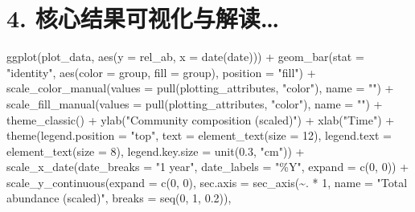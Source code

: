 \documentclass[
  letterpaper,
  DIV=11,
  numbers=noendperiod]{scrreprt}
\newenvironment{Shaded}{\begin{snugshade}}{\end{snugshade}}
\newcommand{\AttributeTok}[1]{\textcolor[rgb]{0.40,0.45,0.13}{#1}}
\newcommand{\DecValTok}[1]{\textcolor[rgb]{0.68,0.00,0.00}{#1}}
\newcommand{\FloatTok}[1]{\textcolor[rgb]{0.68,0.00,0.00}{#1}}
\newcommand{\FunctionTok}[1]{\textcolor[rgb]{0.28,0.35,0.67}{#1}}
\newcommand{\NormalTok}[1]{\textcolor[rgb]{0.00,0.23,0.31}{#1}}
\newcommand{\SpecialCharTok}[1]{\textcolor[rgb]{0.37,0.37,0.37}{#1}}
\newcommand{\StringTok}[1]{\textcolor[rgb]{0.13,0.47,0.30}{#1}}
\begin{document}
\section{4.
核心结果可视化与解读\ldots{}}\label{ux6838ux5fc3ux7ed3ux679cux53efux89c6ux5316ux4e0eux89e3ux8bfb}

\begin{Shaded}
\begin{Highlighting}[]
\FunctionTok{ggplot}\NormalTok{(plot\_data, }\FunctionTok{aes}\NormalTok{(}\AttributeTok{y =}\NormalTok{ rel\_ab, }\AttributeTok{x =} \FunctionTok{date}\NormalTok{(date))) }\SpecialCharTok{+}
  \FunctionTok{geom\_bar}\NormalTok{(}\AttributeTok{stat =} \StringTok{"identity"}\NormalTok{, }\FunctionTok{aes}\NormalTok{(}\AttributeTok{color =}\NormalTok{ group, }\AttributeTok{fill =}\NormalTok{ group), }\AttributeTok{position =} \StringTok{"fill"}\NormalTok{) }\SpecialCharTok{+}
  \FunctionTok{scale\_color\_manual}\NormalTok{(}\AttributeTok{values =} \FunctionTok{pull}\NormalTok{(plotting\_attributes, }\StringTok{"color"}\NormalTok{), }\AttributeTok{name =} \StringTok{""}\NormalTok{) }\SpecialCharTok{+}
  \FunctionTok{scale\_fill\_manual}\NormalTok{(}\AttributeTok{values =} \FunctionTok{pull}\NormalTok{(plotting\_attributes, }\StringTok{"color"}\NormalTok{), }\AttributeTok{name =} \StringTok{""}\NormalTok{) }\SpecialCharTok{+}
  \FunctionTok{theme\_classic}\NormalTok{() }\SpecialCharTok{+}
  \FunctionTok{ylab}\NormalTok{(}\StringTok{"Community composition (scaled)"}\NormalTok{) }\SpecialCharTok{+}
  \FunctionTok{xlab}\NormalTok{(}\StringTok{"Time"}\NormalTok{) }\SpecialCharTok{+}
  \FunctionTok{theme}\NormalTok{(}\AttributeTok{legend.position =} \StringTok{"top"}\NormalTok{, }
        \AttributeTok{text =} \FunctionTok{element\_text}\NormalTok{(}\AttributeTok{size =} \DecValTok{12}\NormalTok{), }
        \AttributeTok{legend.text =} \FunctionTok{element\_text}\NormalTok{(}\AttributeTok{size =} \DecValTok{8}\NormalTok{), }
        \AttributeTok{legend.key.size =} \FunctionTok{unit}\NormalTok{(}\FloatTok{0.3}\NormalTok{, }\StringTok{"cm"}\NormalTok{)) }\SpecialCharTok{+} 
  \FunctionTok{scale\_x\_date}\NormalTok{(}\AttributeTok{date\_breaks =} \StringTok{"1 year"}\NormalTok{, }\AttributeTok{date\_labels =} \StringTok{"\%Y"}\NormalTok{, }\AttributeTok{expand =} \FunctionTok{c}\NormalTok{(}\DecValTok{0}\NormalTok{, }\DecValTok{0}\NormalTok{)) }\SpecialCharTok{+}
  \FunctionTok{scale\_y\_continuous}\NormalTok{(}\AttributeTok{expand =} \FunctionTok{c}\NormalTok{(}\DecValTok{0}\NormalTok{, }\DecValTok{0}\NormalTok{), }
                     \AttributeTok{sec.axis =} \FunctionTok{sec\_axis}\NormalTok{(}\SpecialCharTok{\textasciitilde{}}\NormalTok{. }\SpecialCharTok{*} \DecValTok{1}\NormalTok{, }\AttributeTok{name =} \StringTok{"Total abundance (scaled)"}\NormalTok{, }\AttributeTok{breaks =} \FunctionTok{seq}\NormalTok{(}\DecValTok{0}\NormalTok{, }\DecValTok{1}\NormalTok{, }\FloatTok{0.2}\NormalTok{)), }

\end{Highlighting}
\end{Shaded}
\end{document}
